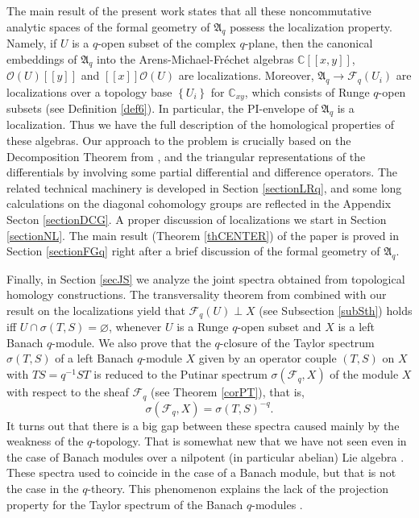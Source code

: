 \documentclass[12pt,reqno]{amsart}%
\theoremstyle{plain}
\numberwithin{theorem}{section} \numberwithin{equation}{section}
\numberwithin{lemma}{section}
\numberwithin{remark}{section}
\numberwithin{example}{section}
\numberwithin{proposition}{section}
\numberwithin{definition}{section}
\numberwithin{corollary}{section}
\begin{document}
The main result of the present work states that all these noncommutative
analytic spaces of the formal geometry of $\mathfrak{A}_{q}$ possess the
localization property. Namely, if $U$ is a $q$-open subset of the complex
$q$-plane, then the canonical embeddings of $\mathfrak{A}_{q}$ into the
Arens-Michael-Fr\'{e}chet algebras $\mathbb{C}\left[  \left[  x,y\right]
\right]  $, $\mathcal{O}\left(  U\right)  \left[  \left[  y\right]  \right]  $
and $\left[  \left[  x\right]  \right]  \mathcal{O}\left(  U\right)  $ are
localizations. Moreover, $\mathfrak{A}_{q}\rightarrow\mathcal{F}_{q}\left(
U_{i}\right)  $ are localizations over a topology base $\left\{
U_{i}\right\}  $ for $\mathbb{C}_{xy}$, which consists of Runge $q$-open
subsets (see Definition \ref{def6}). In particular, the PI-envelope of
$\mathfrak{A}_{q}$ is a localization. Thus we have the full description of the
homological properties of these algebras. Our approach to the problem is
crucially based on the Decomposition Theorem from \cite{Dosi25}, and the
triangular representations of the differentials by involving some partial
differential and difference operators. The related technical machinery is
developed in Section \ref{sectionLRq}, and some long calculations on the
diagonal cohomology groups are reflected in the Appendix Secton
\ref{sectionDCG}. A proper discussion of localizations we start in Section
\ref{sectionNL}. The main result (Theorem \ref{thCENTER}) of the paper is
proved in Section \ref{sectionFGq} right after a brief discussion of the
formal geometry of $\mathfrak{A}_{q}$.

Finally, in Section \ref{secJS} we analyze the joint spectra obtained from
topological homology constructions. The transversality theorem from
\cite[Theorem 6.5]{Dosi25} combined with our result on the localizations yield
that $\mathcal{F}_{q}\left(  U\right)  \perp X$ (see Subsection \ref{subSth})
holds iff $U\cap\sigma\left(  T,S\right)  =\varnothing$, whenever $U$ is a
Runge $q$-open subset and $X$ is a left Banach $q$-module. We also prove that
the $q$-closure of the Taylor spectrum $\sigma\left(  T,S\right)  $ of a left
Banach $q$-module $X$ given by an operator couple $\left(  T,S\right)  $ on
$X$ with $TS=q^{-1}ST$ is reduced to the Putinar spectrum $\sigma\left(
\mathcal{F}_{q},X\right)  $ of the module $X$ with respect to the sheaf
$\mathcal{F}_{q}$ (see Theorem \ref{corPT}), that is,
\[
\sigma\left(  \mathcal{F}_{q},X\right)  =\sigma\left(  T,S\right)
^{-q}\text{.}%
\]
It turns out that there is a big gap between these spectra caused mainly by
the weakness of the $q$-topology. That is somewhat new that we have not seen
even in the case of Banach modules over a nilpotent (in particular abelian)
Lie algebra \cite[Proposition 5.3]{DosJOT10}. These spectra used to coincide
in the case of a Banach module, but that is not the case in the $q$-theory.
This phenomenon explains the lack of the projection property for the Taylor
spectrum of the Banach $q$-modules \cite{Dosi242}.
\end{document}
